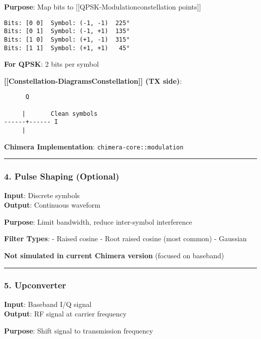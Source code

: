 \textbf{Purpose}: Map bits to
{[}{[}QPSK-Modulation\textbar constellation points{]}{]}

\begin{verbatim}
Bits: [0 0]  Symbol: (-1, -1)  225°
Bits: [0 1]  Symbol: (-1, +1)  135°
Bits: [1 0]  Symbol: (+1, -1)  315°
Bits: [1 1]  Symbol: (+1, +1)   45°
\end{verbatim}

\textbf{For QPSK}: 2 bits per symbol

\textbf{{[}{[}Constellation-Diagrams\textbar Constellation{]}{]} (TX
side)}:

\begin{verbatim}
      Q
      
     |       Clean symbols
------+------ I
     |   
\end{verbatim}

\textbf{Chimera Implementation}: \texttt{chimera-core::modulation}

\begin{center}\rule{0.5\linewidth}{0.5pt}\end{center}

\subsubsection{4. Pulse Shaping
(Optional)}\label{pulse-shaping-optional}

\textbf{Input}: Discrete symbols\\
\textbf{Output}: Continuous waveform

\textbf{Purpose}: Limit bandwidth, reduce inter-symbol interference

\textbf{Filter Types}: - Raised cosine - Root raised cosine (most
common) - Gaussian

\textbf{Not simulated in current Chimera version} (focused on baseband)

\begin{center}\rule{0.5\linewidth}{0.5pt}\end{center}

\subsubsection{5. Upconverter}\label{upconverter}

\textbf{Input}: Baseband I/Q signal\\
\textbf{Output}: RF signal at carrier frequency

\textbf{Purpose}: Shift signal to transmission frequency

